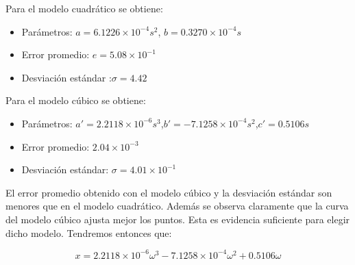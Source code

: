 \documentclass[main]{subfiles}
\begin{document}
Para el modelo cuadr\'atico se obtiene:
\begin{itemize}
\item Par\'ametros: \newline$a=6.1226\times10^{-4}s^2$, \newline$b=0.3270\times 10^{-4}s$
\item Error promedio: $e=5.08\times 10 ^{-1}$
\item Desviaci\'on est\'andar :$\sigma=4.42$
\end{itemize}

Para el modelo c\'ubico se obtiene:
\begin{itemize}
\item Par\'ametros: \newline$a\prime = 2.2118\times 10^{-6}s^3$,\newline$b\prime =-7.1258\times 10^{-4}s^2$,\newline$c\prime=0.5106s$
\item Error promedio: $2.04\times10^{-3} $
\item Desviaci\'on est\'andar: $\sigma=4.01\times 10^{-1}$
\end{itemize}

El error promedio obtenido con el modelo c\'ubico y la desviaci\'on est\'andar son menores que en el modelo cuadr\'atico. Adem\'as se observa claramente que la curva del modelo c\'ubico ajusta mejor los puntos. Esta es evidencia suficiente para elegir dicho modelo. Tendremos entonces que:

\begin{equation}
x=2.2118\times 10^{-6}\omega^3 -7.1258\times 10^{-4}\omega^2+0.5106\omega
\end{equation}
\end{document}
